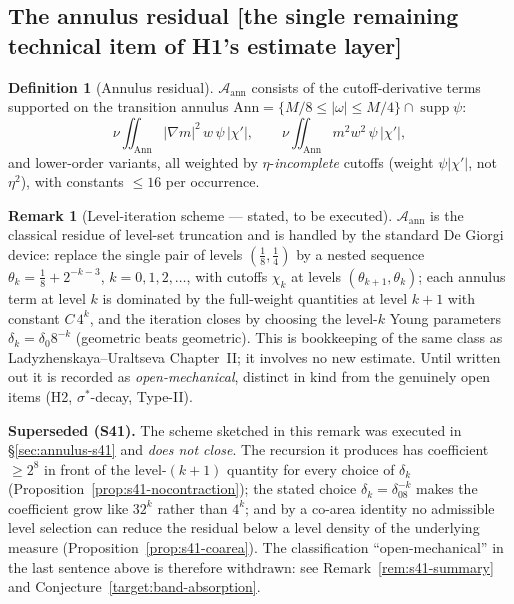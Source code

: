 \documentclass[11pt]{article}
\theoremstyle{definition}
\newtheorem{definition}[theorem]{Definition}
\newtheorem{remark}[theorem]{Remark}
\theoremstyle{remark}
\begin{document}
\subsection{The annulus residual [the single remaining technical item of H1's estimate layer]}

\begin{definition}[Annulus residual]\label{def:annulus-residual}
  $\mathcal{A}_{\mathrm{ann}}$ consists of the cutoff-derivative terms
  supported on the transition annulus
  $\mathrm{Ann} = \{M/8\leq|\omega|\leq M/4\}\cap\operatorname{supp}\psi$:
  \[
    \nu\iint_{\mathrm{Ann}}|\nabla m|^2\,w\,\psi\,|\chi'| ,
    \qquad
    \nu\iint_{\mathrm{Ann}}m^2 w^2\,\psi\,|\chi'| ,
  \]
  and lower-order variants, all weighted by $\eta$-\emph{incomplete}
  cutoffs (weight $\psi|\chi'|$, not $\eta^2$), with constants
  $\leq 16$ per occurrence.
\end{definition}

\begin{remark}[Level-iteration scheme --- stated, to be executed]
  \label{rem:level-iteration}
  $\mathcal{A}_{\mathrm{ann}}$ is the classical residue of level-set
  truncation and is handled by the standard De Giorgi device: replace the
  single pair of levels $(\tfrac18,\tfrac14)$ by a nested sequence
  $\theta_k = \tfrac18 + 2^{-k-3}$, $k=0,1,2,\dots$, with cutoffs
  $\chi_k$ at levels $(\theta_{k+1},\theta_k)$; each annulus term at level
  $k$ is dominated by the full-weight quantities at level $k+1$ with
  constant $C\,4^{k}$, and the iteration closes by choosing the level-$k$
  Young parameters $\delta_k = \delta_0 8^{-k}$ (geometric beats
  geometric). This is bookkeeping of the same class as
  Ladyzhenskaya--Uraltseva Chapter~II; it involves no new estimate. Until
  written out it is recorded as \emph{open-mechanical}, distinct in kind
  from the genuinely open items (H2, $\sigma^*$-decay, Type-II).

  \medskip
  \noindent\textbf{\color{red}Superseded (S41).} The scheme sketched in this
  remark was executed in \S\ref{sec:annulus-s41} and \emph{does not close}.
  The recursion it produces has coefficient $\geq2^{8}$ in front of the
  level-$(k+1)$ quantity for every choice of $\delta_k$
  (Proposition~\ref{prop:s41-nocontraction}); the stated choice
  $\delta_k=\delta_08^{-k}$ makes the coefficient grow like $32^{k}$ rather
  than $4^{k}$; and by a co-area identity no admissible level selection can
  reduce the residual below a level density of the underlying measure
  (Proposition~\ref{prop:s41-coarea}). The classification
  ``open-mechanical'' in the last sentence above is therefore withdrawn: see
  Remark~\ref{rem:s41-summary} and Conjecture~\ref{target:band-absorption}.
\end{remark}
\end{document}
